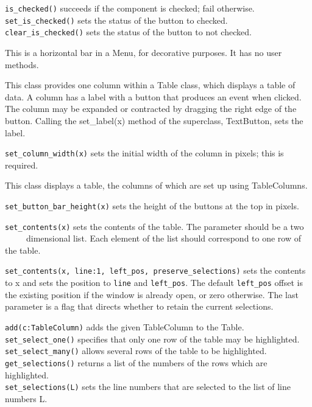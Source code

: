 \texttt{is\_checked()} succeeds if the component is checked; fail
otherwise.\\
\texttt{set\_is\_checked()} sets the status of the button to checked.\\
\texttt{clear\_is\_checked()} sets the status of the button to not checked.


This is a horizontal bar in a Menu, for decorative purposes. It
has no user methods.


This class provides one column within a Table class, which displays a
table of data. A column has a label with a button that produces an
event when clicked. The column may be expanded or contracted by
dragging the right edge of the button. Calling the set\_label(x) method
of the superclass, TextButton, sets the label.

\texttt{set\_column\_width(x)} sets the initial width of the column in pixels;
this is required.



This class displays a table, the columns of which are set up using
TableColumns.

\texttt{set\_button\_bar\_height(x)} sets the height of the buttons at the top
in pixels.

\texttt{set\_contents(x)} sets the contents of the table. The parameter should be
a two\\
 \ \ \ \ \ dimensional list. Each element of the list should correspond
to one row of the table.

\texttt{set\_contents(x, line:1, left\_pos, preserve\_selections)} sets the
contents to x and sets the position to \texttt{line} and
\texttt{left\_pos}. The default \texttt{left\_pos} offset is
the existing position if the window is already open, or zero
otherwise. The
last parameter is a flag that directs whether to retain the current selections.


\texttt{add(c:TableColumn)} adds the given TableColumn to the Table.\\
\texttt{set\_select\_one()} specifies that only one row of the table may be
highlighted.\\
\texttt{set\_select\_many()} allows several rows of the table to be
highlighted.\\
\texttt{get\_selections()} returns a list of the numbers of the rows which are
highlighted.\\
\texttt{set\_selections(L)} sets the line numbers that are selected to the
list of line numbers L.


